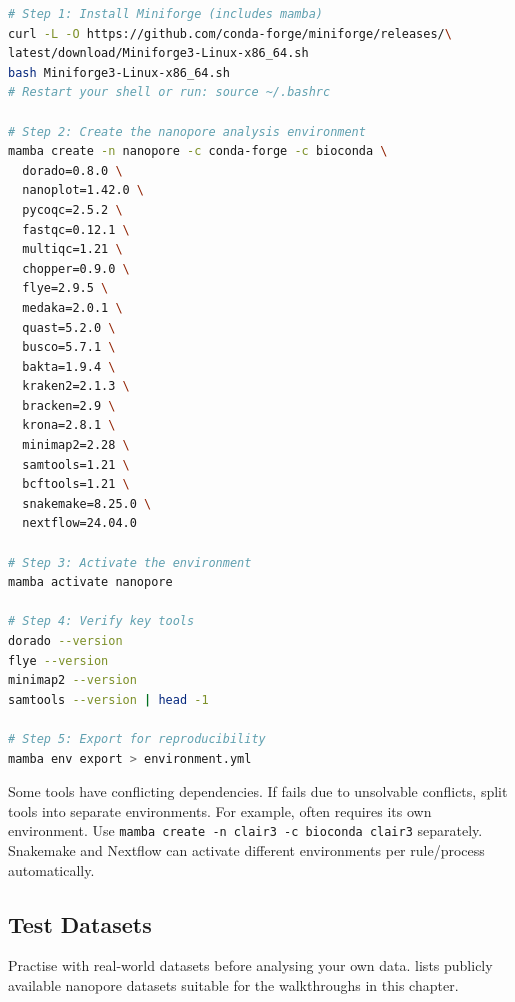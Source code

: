 \begin{lstlisting}[language=bash,caption={Installing Miniforge and creating the analysis environment.},label=lst:diy-conda-setup]
# Step 1: Install Miniforge (includes mamba)
curl -L -O https://github.com/conda-forge/miniforge/releases/\
latest/download/Miniforge3-Linux-x86_64.sh
bash Miniforge3-Linux-x86_64.sh
# Restart your shell or run: source ~/.bashrc

# Step 2: Create the nanopore analysis environment
mamba create -n nanopore -c conda-forge -c bioconda \
  dorado=0.8.0 \
  nanoplot=1.42.0 \
  pycoqc=2.5.2 \
  fastqc=0.12.1 \
  multiqc=1.21 \
  chopper=0.9.0 \
  flye=2.9.5 \
  medaka=2.0.1 \
  quast=5.2.0 \
  busco=5.7.1 \
  bakta=1.9.4 \
  kraken2=2.1.3 \
  bracken=2.9 \
  krona=2.8.1 \
  minimap2=2.28 \
  samtools=1.21 \
  bcftools=1.21 \
  snakemake=8.25.0 \
  nextflow=24.04.0

# Step 3: Activate the environment
mamba activate nanopore

# Step 4: Verify key tools
dorado --version
flye --version
minimap2 --version
samtools --version | head -1

# Step 5: Export for reproducibility
mamba env export > environment.yml
\end{lstlisting}

\begin{tipbox}[title={Separate Environments for Conflicting Tools}]
Some tools have conflicting dependencies. If  fails due to unsolvable conflicts, split tools into separate environments. For example,  often requires its own environment. Use \texttt{mamba create -n clair3 -c bioconda clair3} separately. Snakemake and Nextflow can activate different environments per rule/process automatically.
\end{tipbox}

\subsection{Test Datasets}
\label{subsec:diyanalysis:testdata}

Practise with real-world datasets before analysing your own data.  lists publicly available nanopore datasets suitable for the walkthroughs in this chapter.

